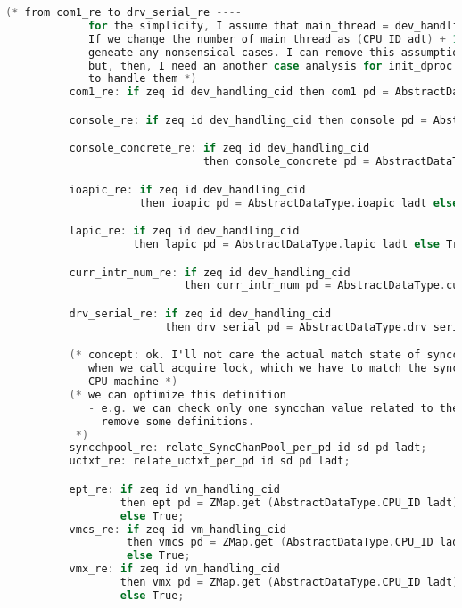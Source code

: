 \begin{lstlisting}[language=C]
          (* from com1_re to drv_serial_re ----
             for the simplicity, I assume that main_thread = dev_handling_cid. 
             If we change the number of main_thread as (CPU_ID adt) + 1, then, this assumption doesn't 
             geneate any nonsensical cases. I can remove this assumption (main_thread = dev_handling_cid), 
             but, then, I need an another case analysis for init_dproc in (EAsm.v and TAsm.v files) 
             to handle them *)
          com1_re: if zeq id dev_handling_cid then com1 pd = AbstractDataType.com1 ladt else True;

          console_re: if zeq id dev_handling_cid then console pd = AbstractDataType.console ladt else True;

          console_concrete_re: if zeq id dev_handling_cid 
                               then console_concrete pd = AbstractDataType.console_concrete ladt else True;

          ioapic_re: if zeq id dev_handling_cid 
                     then ioapic pd = AbstractDataType.ioapic ladt else True;

          lapic_re: if zeq id dev_handling_cid 
                    then lapic pd = AbstractDataType.lapic ladt else True;

          curr_intr_num_re: if zeq id dev_handling_cid 
                            then curr_intr_num pd = AbstractDataType.curr_intr_num ladt else True;

          drv_serial_re: if zeq id dev_handling_cid 
                         then drv_serial pd = AbstractDataType.drv_serial ladt else True;

          (* concept: ok. I'll not care the actual match state of syncchpool except the case 
             when we call acquire_lock, which we have to match the syncchpool with thread-machine with 
             CPU-machine *)
          (* we can optimize this definition 
             - e.g. we can check only one syncchan value related to the lock id. Then, I may be able to 
               remove some definitions. 
           *)
          syncchpool_re: relate_SyncChanPool_per_pd id sd pd ladt;
          uctxt_re: relate_uctxt_per_pd id sd pd ladt;

          ept_re: if zeq id vm_handling_cid
                  then ept pd = ZMap.get (AbstractDataType.CPU_ID ladt) (AbstractDataType.ept ladt)
                  else True;
          vmcs_re: if zeq id vm_handling_cid
                   then vmcs pd = ZMap.get (AbstractDataType.CPU_ID ladt) (AbstractDataType.vmcs ladt)
                   else True;
          vmx_re: if zeq id vm_handling_cid
                  then vmx pd = ZMap.get (AbstractDataType.CPU_ID ladt) (AbstractDataType.vmx ladt)
                  else True;


\end{lstlisting}
